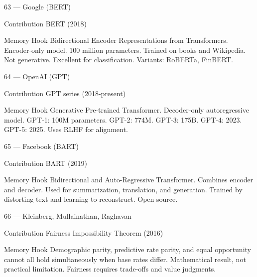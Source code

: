 \documentclass[aspectratio=169,8pt]{beamer}
\begin{document}
	\begin{frame}{63 --- Google (BERT)}
		\begin{block}{Contribution}
			BERT (2018)
		\end{block}
		\begin{block}{Memory Hook}
			Bidirectional Encoder Representations from Transformers. Encoder-only model. 100 million parameters. Trained on books and Wikipedia. Not generative. Excellent for classification. Variants: RoBERTa, FinBERT.
		\end{block}
	\end{frame}
	
	\begin{frame}{64 --- OpenAI (GPT)}
		\begin{block}{Contribution}
			GPT series (2018-present)
		\end{block}
		\begin{block}{Memory Hook}
			Generative Pre-trained Transformer. Decoder-only autoregressive model. GPT-1: 100M parameters. GPT-2: 774M. GPT-3: 175B. GPT-4: 2023. GPT-5: 2025. Uses RLHF for alignment.
		\end{block}
	\end{frame}
	
	\begin{frame}{65 --- Facebook (BART)}
		\begin{block}{Contribution}
			BART (2019)
		\end{block}
		\begin{block}{Memory Hook}
			Bidirectional and Auto-Regressive Transformer. Combines encoder and decoder. Used for summarization, translation, and generation. Trained by distorting text and learning to reconstruct. Open source.
		\end{block}
	\end{frame}
	
	\begin{frame}{66 --- Kleinberg, Mullainathan, Raghavan}
		\begin{block}{Contribution}
			Fairness Impossibility Theorem (2016)
		\end{block}
		\begin{block}{Memory Hook}
			Demographic parity, predictive rate parity, and equal opportunity cannot all hold simultaneously when base rates differ. Mathematical result, not practical limitation. Fairness requires trade-offs and value judgments.
		\end{block}
	\end{frame}
	
\end{document}
